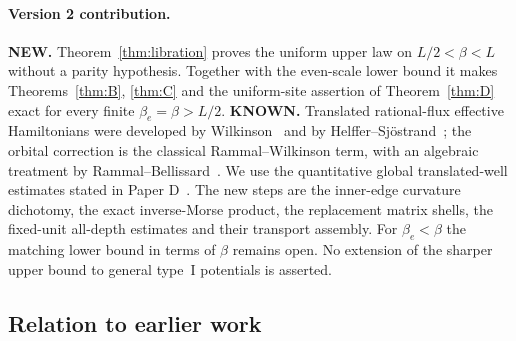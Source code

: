 \paragraph{Version 2 contribution.}
\textbf{NEW.} Theorem~\ref{thm:libration} proves the uniform upper law on $L/2<\beta<L$ without a parity hypothesis. Together with the even-scale lower bound it makes Theorems~\ref{thm:B}, \ref{thm:C} and the uniform-site assertion of Theorem~\ref{thm:D} exact for every finite $\beta_e=\beta>L/2$.
\textbf{KNOWN.} Translated rational-flux effective Hamiltonians were developed by Wilkinson~\cite[p.~4337, abstract]{Wilkinson1987} and by Helffer--Sj\"ostrand~\cite{HSII}; the orbital correction is the classical Rammal--Wilkinson term, with an algebraic treatment by Rammal--Bellissard~\cite{RammalBellissard}. We use the quantitative global translated-well estimates stated in Paper D~\cite{DMband}. The new steps are the inner-edge curvature dichotomy, the exact inverse-Morse product, the replacement matrix shells, the fixed-unit all-depth estimates and their transport assembly. For $\beta_e<\beta$ the matching lower bound in terms of $\beta$ remains open. No extension of the sharper upper bound to general type~I potentials is asserted.

\subsection{Relation to earlier work}

